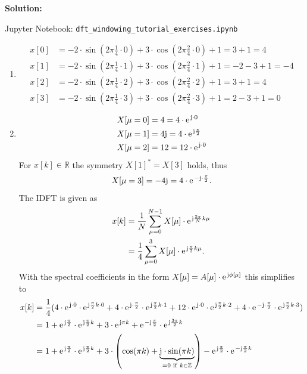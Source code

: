 \documentclass[11pt,a4paper,DIV=12]{scrartcl}
\begin{document}
\begin{Loesung}
\textbf{Solution:}

Jupyter Notebook: \texttt{dft\_windowing\_tutorial\_exercises.ipynb}
\begin{enumerate}[label=\alph*)]
	\item \begin{align}
	x[0]&=-2\cdot\sin\left(2\pi\frac{1}{4}\cdot0\right)+3\cdot\cos\left(2\pi\frac{2}{4}\cdot0\right)+1=3+1=4\nonumber\\
	x[1]&=-2\cdot\sin\left(2\pi\frac{1}{4}\cdot1\right)+3\cdot\cos\left(2\pi\frac{2}{4}\cdot1\right)+1=-2-3+1=-4\nonumber\\
	x[2]&=-2\cdot\sin\left(2\pi\frac{1}{4}\cdot2\right)+3\cdot\cos\left(2\pi\frac{2}{4}\cdot2\right)+1=3+1=4\nonumber\\
	x[3]&=-2\cdot\sin\left(2\pi\frac{1}{4}\cdot3\right)+3\cdot\cos\left(2\pi\frac{2}{4}\cdot3\right)+1=2-3+1=0\nonumber
	\end{align}
	\item \begin{align}
	X[\mu=0]&=4=4\cdot\e^{\im\cdot0}\nonumber\\
	X[\mu=1]&=4\im=4\cdot\e^{\im\frac{\pi}{2}}\nonumber\\
	X[\mu=2]&=12=12\cdot\e^{\im\cdot0}\nonumber
	\end{align}
	For $x[k]\in\mathbb{R}$ the symmetry $X[1]^*=X[3]$ holds, thus
	\begin{align}
	X[\mu=3]=-4\im=4\cdot\e^{-\im\cdot\frac{\pi}{2}}.\nonumber
	\end{align}
	The IDFT is given as
	\begin{align}
	x[k]&=\frac{1}{N}\sum_{\mu=0}^{N-1}X[\mu]\cdot\e^{\im\frac{2\pi}{N}k\mu}\nonumber\\
	&=\frac{1}{4}\sum_{\mu=0}^{3}X[\mu]\cdot\e^{\im\frac{\pi}{2}k\mu}.\nonumber
	\end{align}
	With the spectral coefficients in the form $X[\mu]=A[\mu]\cdot\e^{\im\phi[\mu]}$ this simplifies to
	\begin{align}
  x[k]&=\frac{1}{4}(4\cdot\e^{\im\cdot0}\cdot\e^{\im\frac{\pi}{2}k\cdot0}+4\cdot\e^{\im\cdot\frac{\pi}{2}}\cdot\e^{\im\frac{\pi}{2}k\cdot1}+12\cdot\e^{\im\cdot0}\cdot\e^{\im\frac{\pi}{2}k\cdot2}+4\cdot\e^{-\im\cdot\frac{\pi}{2}}\cdot\e^{\im\frac{\pi}{2}k\cdot3})\nonumber\\
	&=1+\e^{\im\frac{\pi}{2}}\cdot\e^{\im\frac{\pi}{2}k}+3\cdot\e^{\im\pi k}+\e^{-\im\frac{\pi}{2}}\cdot\e^{\im\frac{3\pi}{2}k}\nonumber\\
	&=1+\e^{\im\frac{\pi}{2}}\cdot\e^{\im\frac{\pi}{2}k}+3\cdot\left(\cos(\pi k)+\underbrace{\im\cdot\sin(\pi k)}_{=0\,\,\mathrm{if}\,\,k\in\mathbb{Z}}\right)-\e^{\im\frac{\pi}{2}}\cdot\e^{-\im\frac{\pi}{2}k}\nonumber\\

\end{align}
\end{enumerate}
\end{Loesung}
\end{document}
